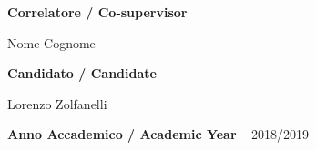 \begin{titlepage}
\begin{helv}
\begin{minipage}{0.8\textwidth}
\begin{flushleft}
{            \vspace{15pt}
            \fontsize{14}{0}\selectfont
            \textbf{Correlatore / Co-supervisor}
            
            \vspace{5pt}
            \fontsize{16}{0}\selectfont
            Nome Cognome
            
            \vspace{15pt}
            \fontsize{14}{0}\selectfont
            \textbf{Candidato / Candidate}
            
            \vspace{5pt}
            \fontsize{16}{0}\selectfont
            Lorenzo Zolfanelli
            
            \vspace{3cm}
            \fontsize{14}{0}\selectfont
            \textbf{Anno Accademico / Academic Year} ~ 2018/2019
        }
        \end{flushleft}
        \end{minipage}
\end{helv}
\end{titlepage}